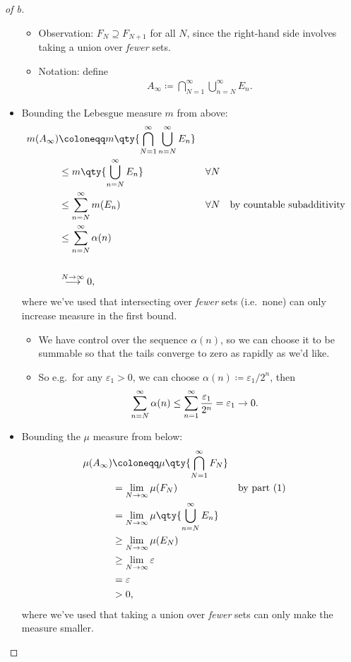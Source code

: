 \begin{solution}
\begin{proof}[of b]
\begin{itemize}
  \begin{itemize}
  \tightlist
  \item
    Observation: \(F_N \supseteq F_{N+1}\) for all \(N\), since the
    right-hand side involves taking a union over \emph{fewer} sets.
  \item
    Notation: define
    \begin{align*}
    A_\infty \coloneqq\displaystyle\bigcap_{N=1}^\infty \displaystyle\bigcup_{n=N}^\infty E_n
    .\end{align*}
  \end{itemize}
\item
  Bounding the Lebesgue measure \(m\) from above:
  \begin{align*}
  m(A_\infty)
  &\coloneqq
  m\qty{ 
  \displaystyle\bigcap_{N=1}^\infty \displaystyle\bigcup_{n=N}^\infty E_n
  } \\
  &\leq
  m\qty{ 
  \displaystyle\bigcup_{n=N}^\infty E_n
  } && \forall N \\
  &\leq \sum_{n=N}^\infty m(E_n) && \forall N \quad \text{by countable subadditivity} \\
  &\leq \sum_{n=N}^\infty \alpha(n) \\ \\
  &\overset{N\to\infty}\longrightarrow 0
  ,\end{align*}
  where we've used that intersecting over \emph{fewer} sets (i.e.~none)
  can only increase measure in the first bound.

  \begin{itemize}
  \tightlist
  \item
    We have control over the sequence \(\alpha(n)\), so we can choose it
    to be summable so that the tails converge to zero as rapidly as we'd
    like.
  \item
    So e.g.~for any \({\varepsilon}_1 >0\), we can choose
    \(\alpha(n) \coloneqq{\varepsilon}_1/2^n\), then
    \begin{align*}
    \sum_{n=N}^\infty \alpha(n) &\leq \sum_{n=1}^\infty {{\varepsilon}_1 \over 2^n} = {\varepsilon}_1 \to 0
    .\end{align*}
  \end{itemize}
\item
  Bounding the \(\mu\) measure from below:
  \begin{align*}
  \mu(A_\infty) 
  &\coloneqq
  \mu\qty{\displaystyle\bigcap_{N=1}^\infty F_N} \\
  &= \lim_{N\to\infty} \mu(F_N) && \text{by part (1) }\\
  &= \lim_{N\to\infty} \mu\qty{ \displaystyle\bigcup_{n=N}^\infty E_n } \\
  &\geq \lim_{N\to\infty} \mu(E_N ) \\
  &\geq \lim_{N\to\infty} {\varepsilon}\\
  &= {\varepsilon}\\
  &>0
  ,\end{align*}
  where we've used that taking a union over \emph{fewer} sets can only
  make the measure smaller.
\end{itemize}


\end{proof}
\end{solution}
